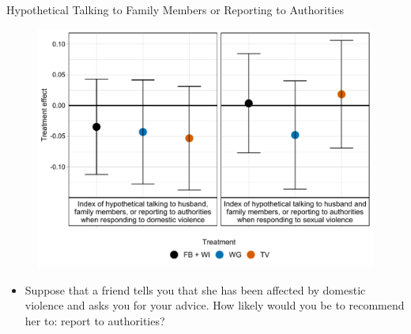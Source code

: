 \documentclass[10pt]{beamer}
\begin{document}
\begin{frame}{Hypothetical Talking to Family Members or Reporting to Authorities}
\begin{figure}[H]
    \centering
    \includegraphics[width=.64\textwidth]{Figures/RF-FS/FigureA1.pdf}
\end{figure}
\begin{itemize}
        \item Suppose that a friend tells you that she has been affected by domestic violence and asks you for your advice. How likely would you be to recommend her to: report to authorities?
\end{itemize}
\end{frame}
\end{document}

